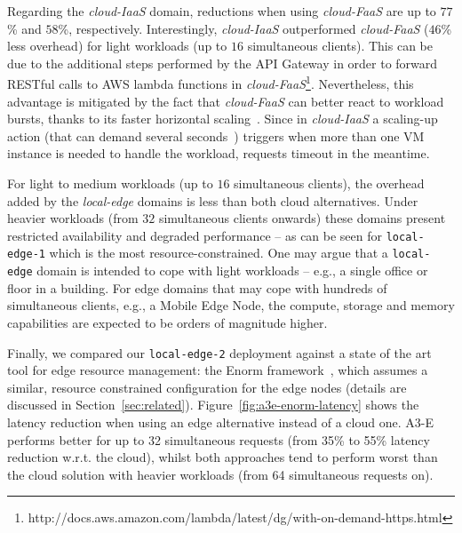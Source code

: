   Regarding the \textit{cloud-IaaS} domain, reductions when using \textit{cloud-FaaS} are up to $77$\% and $58$\%, respectively. Interestingly, \textit{cloud-IaaS} outperformed  \textit{cloud-FaaS} ($46$\% less overhead) for light workloads (up to $16$ simultaneous clients). This can be due to the additional steps performed by the API Gateway in order to forward RESTful calls to AWS lambda functions in \textit{cloud-FaaS}\footnote{http://docs.aws.amazon.com/lambda/latest/dg/with-on-demand-https.html}. Nevertheless, this advantage is mitigated by the fact that \textit{cloud-FaaS} can better react to workload bursts, thanks to its faster horizontal scaling~\cite{Villamizar2017lambda,Hendrickson:2016}. Since in \textit{cloud-IaaS} a scaling-up action (that can demand several seconds~\cite{Quatrocchi2016discrete}) triggers when more than one VM instance is needed to handle the workload, requests timeout in the meantime. 
 
 For light to medium workloads (up to $16$ simultaneous clients), the overhead added by the \textit{local-edge} domains is less than both cloud alternatives. Under heavier workloads (from $32$ simultaneous clients onwards) these domains present restricted availability and degraded performance -- as can be seen for \texttt{local-edge-1} which is the most resource-constrained. One may argue that a \texttt{local-edge} domain is intended to cope with light workloads -- e.g., a single office or floor in a building. For edge domains that may cope with hundreds of simultaneous clients, e.g., a Mobile Edge Node, the compute, storage and memory capabilities are expected to be orders of magnitude higher.
 
Finally, we compared our \texttt{local-edge-2} deployment against a state of the art tool for edge resource management: the Enorm framework~\cite{wang2017enorm}, which assumes a similar, resource constrained configuration for the edge nodes (details are discussed in Section~\ref{sec:related}). Figure~\ref{fig:a3e-enorm-latency} shows the latency reduction when using an edge alternative instead of a cloud one. A3-E performs better for up to 32 simultaneous requests (from 35\% to 55\% latency reduction w.r.t. the cloud), whilst both approaches tend to perform worst than the cloud solution with heavier workloads (from 64 simultaneous requests on).  




